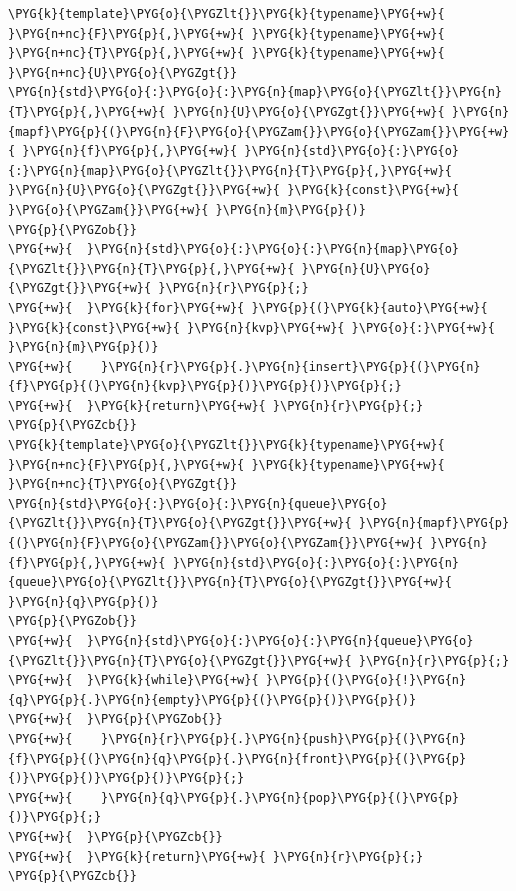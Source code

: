 \begin{itemize}
\begin{codeblockbg}
\begin{Verbatim}[commandchars=\\\{\},breaklines=true,breakanywhere=true,fontsize=\codefont,xleftmargin=17bp]
\PYG{k}{template}\PYG{o}{\PYGZlt{}}\PYG{k}{typename}\PYG{+w}{ }\PYG{n+nc}{F}\PYG{p}{,}\PYG{+w}{ }\PYG{k}{typename}\PYG{+w}{ }\PYG{n+nc}{T}\PYG{p}{,}\PYG{+w}{ }\PYG{k}{typename}\PYG{+w}{ }\PYG{n+nc}{U}\PYG{o}{\PYGZgt{}}
\PYG{n}{std}\PYG{o}{:}\PYG{o}{:}\PYG{n}{map}\PYG{o}{\PYGZlt{}}\PYG{n}{T}\PYG{p}{,}\PYG{+w}{ }\PYG{n}{U}\PYG{o}{\PYGZgt{}}\PYG{+w}{ }\PYG{n}{mapf}\PYG{p}{(}\PYG{n}{F}\PYG{o}{\PYGZam{}}\PYG{o}{\PYGZam{}}\PYG{+w}{ }\PYG{n}{f}\PYG{p}{,}\PYG{+w}{ }\PYG{n}{std}\PYG{o}{:}\PYG{o}{:}\PYG{n}{map}\PYG{o}{\PYGZlt{}}\PYG{n}{T}\PYG{p}{,}\PYG{+w}{ }\PYG{n}{U}\PYG{o}{\PYGZgt{}}\PYG{+w}{ }\PYG{k}{const}\PYG{+w}{ }\PYG{o}{\PYGZam{}}\PYG{+w}{ }\PYG{n}{m}\PYG{p}{)}
\PYG{p}{\PYGZob{}}
\PYG{+w}{  }\PYG{n}{std}\PYG{o}{:}\PYG{o}{:}\PYG{n}{map}\PYG{o}{\PYGZlt{}}\PYG{n}{T}\PYG{p}{,}\PYG{+w}{ }\PYG{n}{U}\PYG{o}{\PYGZgt{}}\PYG{+w}{ }\PYG{n}{r}\PYG{p}{;}
\PYG{+w}{  }\PYG{k}{for}\PYG{+w}{ }\PYG{p}{(}\PYG{k}{auto}\PYG{+w}{ }\PYG{k}{const}\PYG{+w}{ }\PYG{n}{kvp}\PYG{+w}{ }\PYG{o}{:}\PYG{+w}{ }\PYG{n}{m}\PYG{p}{)}
\PYG{+w}{    }\PYG{n}{r}\PYG{p}{.}\PYG{n}{insert}\PYG{p}{(}\PYG{n}{f}\PYG{p}{(}\PYG{n}{kvp}\PYG{p}{)}\PYG{p}{)}\PYG{p}{;}
\PYG{+w}{  }\PYG{k}{return}\PYG{+w}{ }\PYG{n}{r}\PYG{p}{;}
\PYG{p}{\PYGZcb{}}
\PYG{k}{template}\PYG{o}{\PYGZlt{}}\PYG{k}{typename}\PYG{+w}{ }\PYG{n+nc}{F}\PYG{p}{,}\PYG{+w}{ }\PYG{k}{typename}\PYG{+w}{ }\PYG{n+nc}{T}\PYG{o}{\PYGZgt{}}
\PYG{n}{std}\PYG{o}{:}\PYG{o}{:}\PYG{n}{queue}\PYG{o}{\PYGZlt{}}\PYG{n}{T}\PYG{o}{\PYGZgt{}}\PYG{+w}{ }\PYG{n}{mapf}\PYG{p}{(}\PYG{n}{F}\PYG{o}{\PYGZam{}}\PYG{o}{\PYGZam{}}\PYG{+w}{ }\PYG{n}{f}\PYG{p}{,}\PYG{+w}{ }\PYG{n}{std}\PYG{o}{:}\PYG{o}{:}\PYG{n}{queue}\PYG{o}{\PYGZlt{}}\PYG{n}{T}\PYG{o}{\PYGZgt{}}\PYG{+w}{ }\PYG{n}{q}\PYG{p}{)}
\PYG{p}{\PYGZob{}}
\PYG{+w}{  }\PYG{n}{std}\PYG{o}{:}\PYG{o}{:}\PYG{n}{queue}\PYG{o}{\PYGZlt{}}\PYG{n}{T}\PYG{o}{\PYGZgt{}}\PYG{+w}{ }\PYG{n}{r}\PYG{p}{;}
\PYG{+w}{  }\PYG{k}{while}\PYG{+w}{ }\PYG{p}{(}\PYG{o}{!}\PYG{n}{q}\PYG{p}{.}\PYG{n}{empty}\PYG{p}{(}\PYG{p}{)}\PYG{p}{)}
\PYG{+w}{  }\PYG{p}{\PYGZob{}}
\PYG{+w}{    }\PYG{n}{r}\PYG{p}{.}\PYG{n}{push}\PYG{p}{(}\PYG{n}{f}\PYG{p}{(}\PYG{n}{q}\PYG{p}{.}\PYG{n}{front}\PYG{p}{(}\PYG{p}{)}\PYG{p}{)}\PYG{p}{)}\PYG{p}{;}
\PYG{+w}{    }\PYG{n}{q}\PYG{p}{.}\PYG{n}{pop}\PYG{p}{(}\PYG{p}{)}\PYG{p}{;}
\PYG{+w}{  }\PYG{p}{\PYGZcb{}}
\PYG{+w}{  }\PYG{k}{return}\PYG{+w}{ }\PYG{n}{r}\PYG{p}{;}
\PYG{p}{\PYGZcb{}}
\end{Verbatim}
\end{codeblockbg}


\end{itemize}


